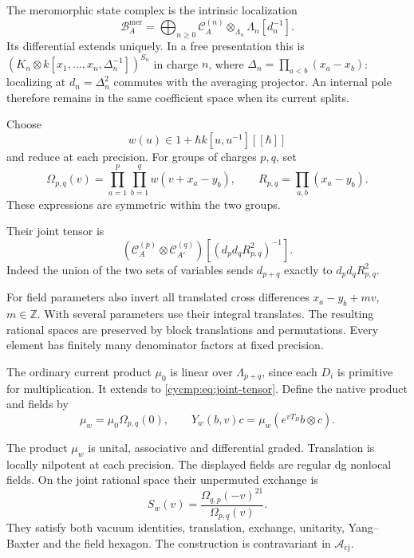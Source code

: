 The meromorphic state complex is the intrinsic localization
\begin{equation}\label{cycmp:eq:meromorphic-core}
 \mathcal B_A^{\mathrm{mer}}=
 \bigoplus_{n\ge0}\mathcal C_A^{(n)}
                \otimes_{\Lambda_n}\Lambda_n[d_n^{-1}].
\end{equation}
Its differential extends uniquely. In a free presentation this is
$(K_n\otimes k[x_1,\ldots,x_n,\Delta_n^{-1}])^{S_n}$ in charge
$n$, where $\Delta_n=\prod_{a<b}(x_a-x_b)$: localizing at
$d_n=\Delta_n^2$ commutes with the averaging projector.
An internal pole therefore remains in the same coefficient space
when its current splits.

Choose
\[
 w(u)\in1+\hbar k[u,u^{-1}][[\hbar]]
\]
and reduce at each precision. For groups of charges $p,q$, set
\[
 \Omega_{p,q}(v)=\prod_{a=1}^p\prod_{b=1}^q w(v+x_a-y_b),
 \qquad R_{p,q}=\prod_{a,b}(x_a-y_b).
\]
These expressions are symmetric within the two groups.

Their joint
tensor is
\begin{equation}\label{cycmp:eq:joint-tensor}
 (\mathcal C_A^{(p)}\otimes\mathcal C_{A'}^{(q)})
                      [(d_pd_qR_{p,q}^2)^{-1}].
\end{equation}
Indeed the union of the two sets of variables sends $d_{p+q}$
exactly to $d_pd_qR_{p,q}^2$.

For field parameters also invert all
translated cross differences $x_a-y_b+mv$, $m\in\mathbb Z$.
With several parameters use their integral translates. The resulting
rational spaces are preserved by block translations and permutations.
Every element has finitely many denominator factors at fixed precision.

The ordinary current product $\mu_0$ is linear over
$\Lambda_{p+q}$, since each $D_i$ is primitive for multiplication.
It extends to \eqref{cycmp:eq:joint-tensor}. Define the native product
and fields by
\begin{equation}\label{cycmp:eq:meromorphic-product}
 \mu_w=\mu_0\Omega_{p,q}(0),\qquad
 Y_w(b,v)c=\mu_w(e^{vT_B}b\otimes c).
\end{equation}

\begin{proposition}\label{cycmp:prop:meromorphic-fields}
The product $\mu_w$ is unital, associative and differential graded.
Translation is locally nilpotent at each precision. The displayed
fields are regular dg nonlocal fields. On the joint rational space
their unpermuted exchange is
\begin{equation}\label{cycmp:eq:meromorphic-exchange}
 S_w(v)=\frac{\Omega_{q,p}(-v)^{21}}{\Omega_{p,q}(v)}.
\end{equation}
They satisfy both vacuum identities, translation, exchange,
unitarity, Yang--Baxter and the field hexagon. The construction is
contravariant in $\mathcal A_{\mathrm{cj}}$.
\end{proposition}

